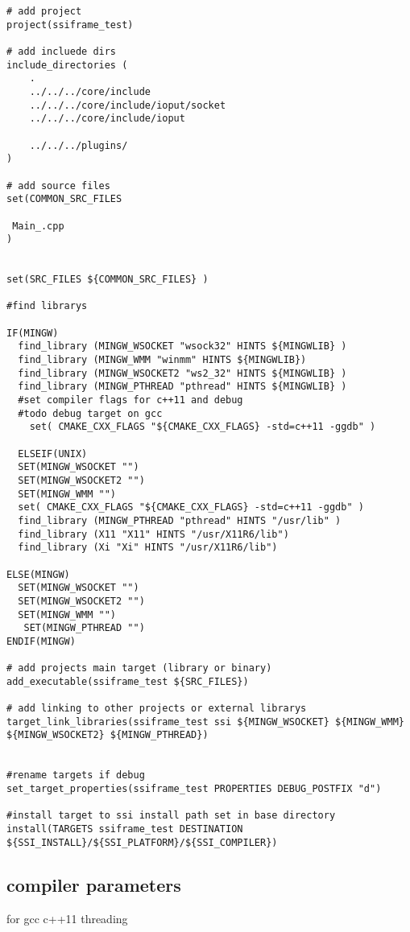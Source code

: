 \documentclass[
10pt, %
a4paper, %
oneside, %
headinclude,footinclude, %
BCOR5mm, %
]{scrartcl}
\begin{document}
\label{subsec:how to add a test or tool}
\begin{lstlisting}[caption={cmake subproject}]
# add project
project(ssiframe_test)

# add incluede dirs
include_directories (
	.
	../../../core/include
	../../../core/include/ioput/socket
	../../../core/include/ioput
	
	../../../plugins/
)

# add source files
set(COMMON_SRC_FILES

 Main_.cpp
)


set(SRC_FILES ${COMMON_SRC_FILES} )

#find librarys

IF(MINGW)
  find_library (MINGW_WSOCKET "wsock32" HINTS ${MINGWLIB} )
  find_library (MINGW_WMM "winmm" HINTS ${MINGWLIB})
  find_library (MINGW_WSOCKET2 "ws2_32" HINTS ${MINGWLIB} )
  find_library (MINGW_PTHREAD "pthread" HINTS ${MINGWLIB} )
  #set compiler flags for c++11 and debug
  #todo debug target on gcc
  	set( CMAKE_CXX_FLAGS "${CMAKE_CXX_FLAGS} -std=c++11 -ggdb" )
  	
  ELSEIF(UNIX)
  SET(MINGW_WSOCKET "")
  SET(MINGW_WSOCKET2 "")
  SET(MINGW_WMM "")
  set( CMAKE_CXX_FLAGS "${CMAKE_CXX_FLAGS} -std=c++11 -ggdb" )
  find_library (MINGW_PTHREAD "pthread" HINTS "/usr/lib" )
  find_library (X11 "X11" HINTS "/usr/X11R6/lib")
  find_library (Xi "Xi" HINTS "/usr/X11R6/lib")
  
ELSE(MINGW)
  SET(MINGW_WSOCKET "")
  SET(MINGW_WSOCKET2 "")
  SET(MINGW_WMM "")
   SET(MINGW_PTHREAD "")
ENDIF(MINGW)

# add projects main target (library or binary)
add_executable(ssiframe_test ${SRC_FILES})

# add linking to other projects or external librarys
target_link_libraries(ssiframe_test ssi ${MINGW_WSOCKET} ${MINGW_WMM} ${MINGW_WSOCKET2} ${MINGW_PTHREAD})


#rename targets if debug
set_target_properties(ssiframe_test PROPERTIES DEBUG_POSTFIX "d")

#install target to ssi install path set in base directory
install(TARGETS ssiframe_test DESTINATION ${SSI_INSTALL}/${SSI_PLATFORM}/${SSI_COMPILER})
\end{lstlisting}

\subsection{compiler parameters}
for gcc c++11 threading
\end{document}
